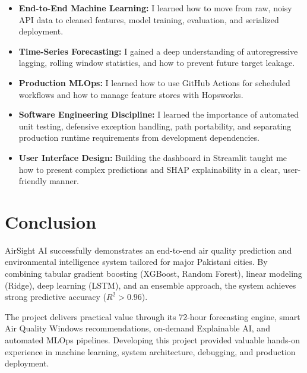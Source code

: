 \documentclass[12pt,a4paper]{article}
\begin{document}
\begin{itemize}
    \item \textbf{End-to-End Machine Learning:} I learned how to move from raw, noisy API data to cleaned features, model training, evaluation, and serialized deployment.
    \item \textbf{Time-Series Forecasting:} I gained a deep understanding of autoregressive lagging, rolling window statistics, and how to prevent future target leakage.
    \item \textbf{Production MLOps:} I learned how to use GitHub Actions for scheduled workflows and how to manage feature stores with Hopsworks.
    \item \textbf{Software Engineering Discipline:} I learned the importance of automated unit testing, defensive exception handling, path portability, and separating production runtime requirements from development dependencies.
    \item \textbf{User Interface Design:} Building the dashboard in Streamlit taught me how to present complex predictions and SHAP explainability in a clear, user-friendly manner.
\end{itemize}

\section{Conclusion}

AirSight AI successfully demonstrates an end-to-end air quality prediction and environmental intelligence system tailored for major Pakistani cities. By combining tabular gradient boosting (XGBoost, Random Forest), linear modeling (Ridge), deep learning (LSTM), and an ensemble approach, the system achieves strong predictive accuracy ($R^2 > 0.96$). 

The project delivers practical value through its 72-hour forecasting engine, smart Air Quality Windows recommendations, on-demand Explainable AI, and automated MLOps pipelines. Developing this project provided valuable hands-on experience in machine learning, system architecture, debugging, and production deployment.
\end{document}
